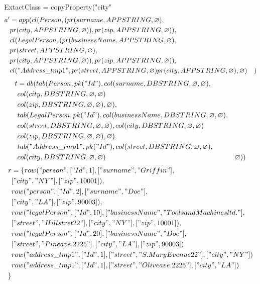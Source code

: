 \documentclass[11pt]{article}
\begin{document}
\newpage
ExtactClass = copyProperty("city"
\begin{align*}
a' &= app(cl(Person, (pr(surname, APPSTRING, \varnothing), \\
& pr(city, APPSTRING, \varnothing)), pr(zip, APPSTRING, \varnothing)), \\
& cl(LegalPerson, (pr(businessName, APPSTRING, \varnothing), \\
& pr(street, APPSTRING, \varnothing), \\
& pr(city, APPSTRING, \varnothing)), pr(zip, APPSTRING, \varnothing)), \\
& cl("Address\_tmp1", pr(street, APPSTRING, \varnothing) pr(city, APPSTRING, \varnothing) , \varnothing)
& )
\end{align*}
\begin{align*}
t &= db(tab(Person, pk("Id"), col(surname, DBSTRING, \varnothing, \varnothing), \\
& col(city, DBSTRING, \varnothing, \varnothing) \\
& col(zip, DBSTRING, \varnothing, \varnothing), \varnothing), \\
& tab(LegalPerson, pk("Id"),  col(businessName, DBSTRING, \varnothing, \varnothing), \\
& col(street, DBSTRING, \varnothing, \varnothing), col(city, DBSTRING, \varnothing, \varnothing) \\
& col(zip, DBSTRING, \varnothing, \varnothing), \varnothing), \\
& tab("Address\_tmp1", pk("Id"), col(street, DBSTRING, \varnothing, \varnothing),\\
& col(city, DBSTRING, \varnothing, \varnothing)
& \varnothing)) 
\end{align*}
\begin{align*}
r &= \{ row("person", ["Id", 1], ["surname", "Griffin"], \\
& ["city", "NY"], ["zip", 10001]), \\
& row("person", ["Id", 2], ["surname", "Doe"], \\
&  ["city", "LA"], ["zip", 90003]), \\
& row("legalPerson", ["Id", 10], ["businessName", "Tools and Machines ltd."], \\
& ["street", "Hill stret 22"], ["city", "NY"], ["zip", 10001]), \\
& row("legalPerson", ["Id", 20], ["businessName", "Doe"], \\
& ["street", "Pine ave. 2225"], ["city", "LA"], ["zip", 90003])\\
& row("address\_tmp1", ["Id", 1], ["street", "S. Mary Evenue 22"], ["city", "NY"]) \\
& row("address\_tmp1", ["Id", 1], ["street", "Olive ave. 2225"], ["city", "LA"] )\\
\}
\end{align*}
\end{document}
